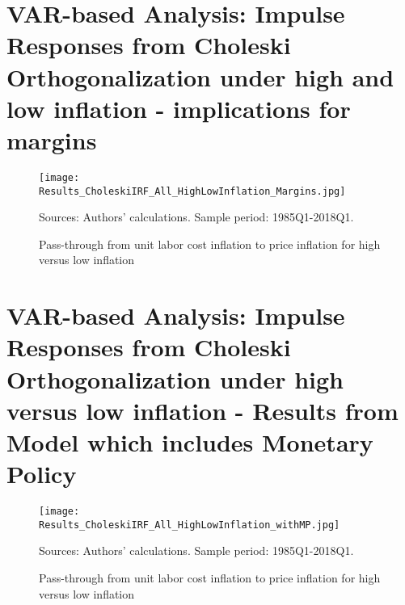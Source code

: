 \documentclass[11pt]{article}
\begin{document}
\begin{appendices}


\clearpage


\section{VAR-based Analysis: Impulse Responses from Choleski Orthogonalization under high and low inflation - implications for margins}
\label{AppendixCholeskiMarginsRegime_highlow}


\begin{figure}[!htbp]
\begin{center}
\caption{Pass-through from unit labor cost inflation to price inflation for high versus low inflation}\label{fig:all_choleski_highlow_margins}
\texttt{[image: Results\_CholeskiIRF\_All\_HighLowInflation\_Margins.jpg]}
\begin{minipage}{\textwidth} {\footnotesize
Sources: Authors' calculations.
Sample period: 1985Q1-2018Q1.\par}
\end{minipage}
\end{center}
\end{figure}


\clearpage


\section{VAR-based Analysis: Impulse Responses from Choleski Orthogonalization under high versus low inflation - Results from Model which includes Monetary Policy}
\label{AppendixCholeskiCountriesHighLow_withMP}


\begin{figure}[!htbp]
\begin{center}
\caption{Pass-through from unit labor cost inflation to price inflation for high versus low inflation}\label{fig:all_choleski_highlow_withMP}
\texttt{[image: Results\_CholeskiIRF\_All\_HighLowInflation\_withMP.jpg]}
\begin{minipage}{\textwidth} {\footnotesize
Sources: Authors' calculations.
Sample period: 1985Q1-2018Q1.\par}
\end{minipage}
\end{center}
\end{figure}


\end{appendices}
\end{document}
